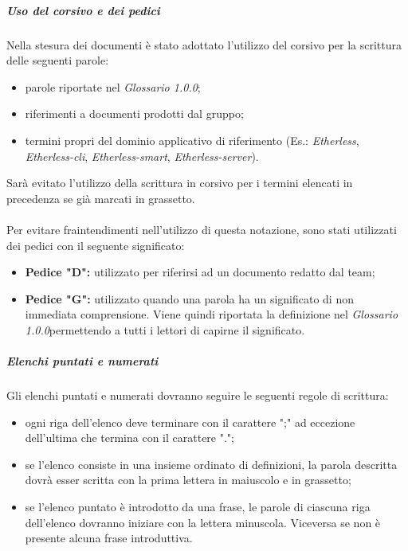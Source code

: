   \subparagraph*{Uso del corsivo e dei pedici}
  Nella stesura dei documenti è stato adottato l'utilizzo del corsivo per la scrittura delle seguenti parole:
  \begin{itemize}
  	\item parole riportate nel \textit{Glossario 1.0.0\docs};
  	\item riferimenti a documenti prodotti dal gruppo;
  	\item termini propri del dominio applicativo di riferimento (Es.: \textit{Etherless}, \textit{Etherless-cli}, \textit{Etherless-smart}, \textit{Etherless-server}).
  \end{itemize} 
  Sarà evitato l'utilizzo della scrittura in corsivo per i termini elencati in precedenza se già marcati in grassetto.\\\\
  Per evitare fraintendimenti nell'utilizzo di questa notazione, sono stati utilizzati dei pedici con il seguente significato:
    \begin{itemize}
      \item \textbf{Pedice "D":} utilizzato per riferirsi ad un documento redatto dal team;
      \item \textbf{Pedice "G":} utilizzato quando una parola ha un significato
      di non immediata comprensione. Viene quindi riportata la definizione nel
      \textit{Glossario 1.0.0}\doc permettendo a tutti i lettori di capirne il significato.
    \end{itemize}

  \subparagraph*{Elenchi puntati e numerati}
  Gli elenchi puntati e numerati dovranno seguire le seguenti regole di scrittura:
	\begin{itemize}
		\item ogni riga dell'elenco deve terminare con il carattere ";" ad eccezione dell'ultima che termina con il carattere ".";
		\item se l'elenco consiste in una insieme ordinato di definizioni, la parola descritta dovrà esser scritta con la prima lettera in maiuscolo e in grassetto;
		\item se l'elenco puntato è introdotto da una frase, le parole di ciascuna riga dell'elenco dovranno iniziare con la lettera minuscola. Viceversa se non è presente alcuna frase introduttiva. 
	\end{itemize}

